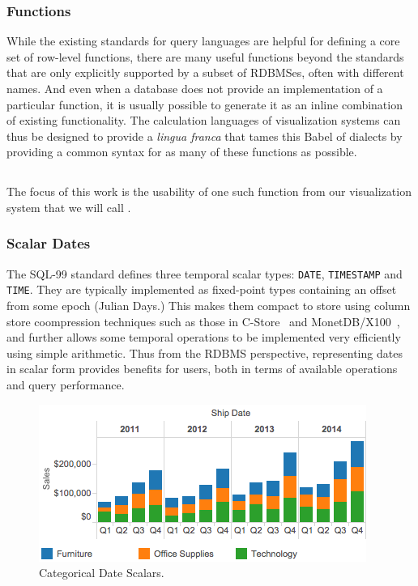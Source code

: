 \subsubsection{Functions}
While the existing standards for query languages are helpful for defining a core set of row-level functions, there are many useful functions beyond the standards that are only explicitly supported by a subset of RDBMSes, often with different names. And even when a database does not provide an implementation of a particular function, it is usually possible to generate it as an inline combination of existing functionality. The calculation languages of visualization systems can thus be designed to provide a \textit{lingua franca} that tames this Babel of dialects by providing a common syntax for as many of these functions as possible.

\subsection{\dateparse}
The focus of this work is the usability of one such function from our visualization system that we will call \dateparse.

\subsubsection{	Scalar Dates}


The SQL-99 standard defines three temporal scalar types: \texttt{DATE}, \texttt{TIMESTAMP} and \texttt{TIME}. They are typically implemented as fixed-point types containing an offset from some epoch (\eg Julian Days.) This makes them compact to store using column store coompression techniques such as those in C-Store~\cite{Stonebraker:2005} and MonetDB/X100~\cite{Zukowski:2006}, and further allows some temporal operations to be implemented very efficiently using simple arithmetic. Thus from the RDBMS perspective, representing dates in scalar form provides  benefits for users, both in terms of available operations and query performance.

\begin{figure}[ht]
\centering
\includegraphics[width=\columnwidth]{figures/FigureI1}
\caption{Categorical Date Scalars.}
\label{fig:I1}
\end{figure}


